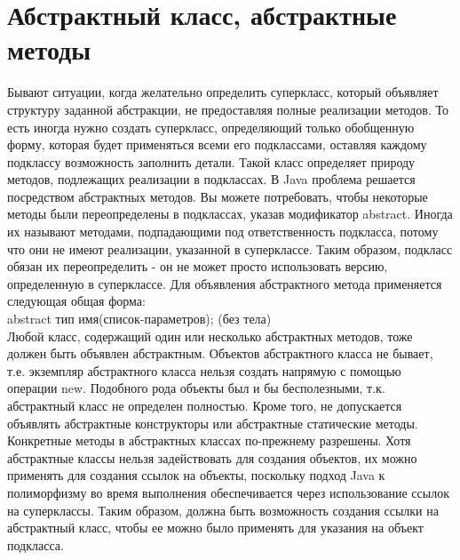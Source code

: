 \section{Абстрактный класс, абстрактные методы}
Бывают ситуации, когда желательно определить суперкласс, который объявляет структуру заданной абстракции, не предоставляя полные реализации методов. То есть иногда нужно создать суперкласс, определяющий только обобщенную форму, которая будет применяться всеми его подклассами, оставляя каждому подклассу возможность заполнить детали. Такой класс определяет природу методов, подлежащих реализации в подклассах. В Java проблема решается посредством абстрактных методов. Вы можете потребовать, чтобы некоторые методы были переопределены в подклассах, указав модификатор abstract. Иногда их называют методами,
подпадающими под ответственность подкласса, потому что они не имеют реализации, указанной в суперклассе. Таким образом, подкласс обязан их
переопределить - он не может просто использовать версию, определенную в суперклассе. Для объявления абстрактного метода применяется следующая общая форма: \\
abstract тип имя(список-параметров); (без тела) \\
Любой класс, содержащий один или несколько абстрактных методов, тоже должен быть объявлен абстрактным. Объектов абстрактного класса не бывает, т.е. экземпляр абстрактного класса нельзя создать напрямую с помощью операции new. Подобного рода объекты был и бы бесполезными, т.к. абстрактный класс не определен полностью. Кроме того, не допускается объявлять абстрактные конструкторы или абстрактные статические методы. Конкретные методы в абстрактных классах по-прежнему разрешены. Хотя абстрактные классы нельзя задействовать для создания объектов, их можно применять для создания ссылок на объекты, поскольку подход Java к полиморфизму во время выполнения обеспечивается через использование
ссылок на суперклассы. Таким образом, должна быть возможность создания ссылки на абстрактный класс, чтобы ее можно было применять для указания
на объект подкласса. 

